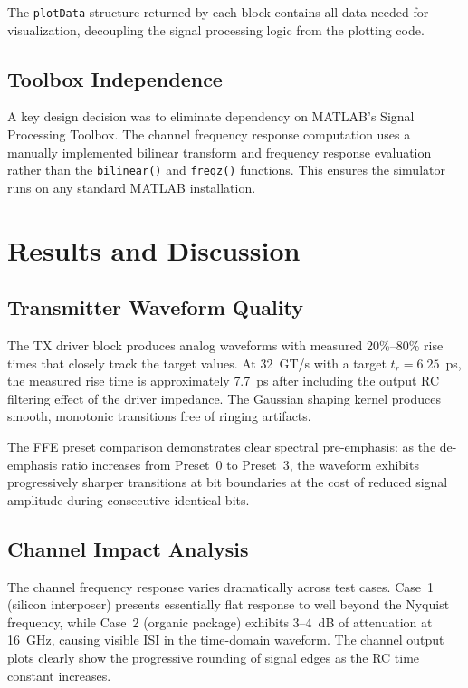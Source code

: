 \documentclass[conference]{IEEEtran}
\begin{document}
The \texttt{plotData} structure returned by each block contains all data needed for visualization, decoupling the signal processing logic from the plotting code.

\subsection{Toolbox Independence}

A key design decision was to eliminate dependency on MATLAB's Signal Processing Toolbox. The channel frequency response computation uses a manually implemented bilinear transform and frequency response evaluation rather than the \texttt{bilinear()} and \texttt{freqz()} functions. This ensures the simulator runs on any standard MATLAB installation.

\section{Results and Discussion}

\subsection{Transmitter Waveform Quality}

The TX driver block produces analog waveforms with measured 20\%--80\% rise times that closely track the target values. At 32~GT/s with a target $t_r = 6.25$~ps, the measured rise time is approximately 7.7~ps after including the output RC filtering effect of the driver impedance. The Gaussian shaping kernel produces smooth, monotonic transitions free of ringing artifacts.

The FFE preset comparison demonstrates clear spectral pre-emphasis: as the de-emphasis ratio increases from Preset~0 to Preset~3, the waveform exhibits progressively sharper transitions at bit boundaries at the cost of reduced signal amplitude during consecutive identical bits.

\subsection{Channel Impact Analysis}

The channel frequency response varies dramatically across test cases. Case~1 (silicon interposer) presents essentially flat response to well beyond the Nyquist frequency, while Case~2 (organic package) exhibits 3--4~dB of attenuation at 16~GHz, causing visible ISI in the time-domain waveform. The channel output plots clearly show the progressive rounding of signal edges as the RC time constant increases.
\end{document}
